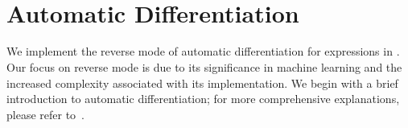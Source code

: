 \begin{code}[hide]%
\>[0]\AgdaSpace{}%
\AgdaSpace{}%
\<%
\\
\>[0]\AgdaSpace{}%
\AgdaSpace{}%
\<%
\\
\>[0]\AgdaSpace{}%
\AgdaSpace{}%
\AgdaSpace{}%
\AgdaSpace{}%
\AgdaSymbol{(}\AgdaSymbol{;}\AgdaSpace{}%
\AgdaInductiveConstructor{[]}\AgdaSymbol{;}\AgdaSpace{}%
\AgdaSymbol{)}\<%
\\
\>[0]\AgdaSpace{}%
\AgdaSpace{}%
\<%
\\
\>[0]\AgdaSpace{}%
\AgdaSpace{}%
\<%
\\
%
\\[\AgdaEmptyExtraSkip]%
\>[0]\<%
\\
\>[0]\AgdaSpace{}%
\AgdaSpace{}%
\<%
\\
\>[0]\AgdaSpace{}%
\AgdaSpace{}%
\<%
\\
\>[0]\AgdaSpace{}%
\AgdaModule{\AgdaUnderscore{}}\AgdaSpace{}%
\<%
\end{code}

\section{Automatic Differentiation\label{sec:ad}}


We implement the reverse mode of automatic differentiation for expressions in
. Our focus on reverse mode is due to its significance in machine
learning and the increased complexity associated with its implementation. We
begin with a brief introduction to automatic differentiation; for more
comprehensive explanations, please refer to~\cite{autodiff-survey,
backprop-stlc}.

